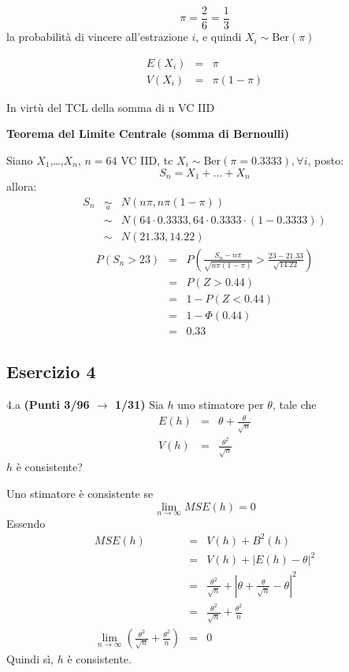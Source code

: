 \documentclass[
  11pt,
]{book}
\theoremstyle{mytheoremstyle}
\theoremstyle{mydefstyle}
\newenvironment{sol}
  {
  \begin{tcolorbox}[enhanced,breakable,arc=0.1mm,boxrule=1pt,colback=white,colframe=iblue,
  title=\bf \fontfamily{lmss}\selectfont \hspace{.5 cm} Soluzione,drop fuzzy shadow]

}{
\end{tcolorbox}
  }
\begin{document}
\begin{sol}
\[
\pi=\frac 2 6=\frac 13
\]
la probabilità di vincere all'estrazione \(i\), e quindi \(X_i\sim\text{Ber}(\pi)\)

\begin{eqnarray*}
E(X_i)&=&\pi\\
V(X_i)&=&\pi(1-\pi)
\end{eqnarray*}

In virtù del TCL della somma di n VC IID

\textbf{Teorema del Limite Centrale (somma di Bernoulli)}

Siano \(X_1\),\ldots,\(X_n\), \(n=64\) VC IID, tc \(X_i\sim\text{Ber}(\pi=0.3333)\)\(,\forall i\), posto:
\[
      S_n = X_1 + ... + X_n
      \]
allora:\begin{eqnarray*}
  S_n & \mathop{\sim}\limits_{a}& N(n\pi,n\pi(1-\pi)) \\
      &\sim & N(64\cdot0.3333,64\cdot0.3333\cdot(1-0.3333)) \\
      &\sim & N(21.33,14.22)
  \end{eqnarray*}\begin{eqnarray*}
      P( S_n   >   23 ) 
        &=& P\left(  \frac { S_n  -  n\pi }{ \sqrt{n\pi(1-\pi)} }  >  \frac { 23  -  21.33 }{\sqrt{ 14.22 }} \right)  \\
                 &=& P\left(  Z   >   0.44 \right) \\    &=& 1-P(Z< 0.44 )\\ 
                 &=&  1-\Phi( 0.44 ) \\ &=&  0.33 
      \end{eqnarray*}

\end{sol}

\subsection{Esercizio 4}\label{esercizio-4-4}

4.a \textbf{(Punti 3/96 \(\rightarrow\) 1/31)} Sia \(h\) uno stimatore per \(\theta\), tale che
\begin{eqnarray*}
E(h)&=&\theta+\frac\theta {\sqrt{ n}}\\
V(h)&=&\frac{\theta^2}{\sqrt n}
\end{eqnarray*}
\(h\) è consistente?

\begin{sol}
Uno stimatore è consistente se
\[
\lim_{n\to\infty} MSE(h)=0
\]
Essendo
\begin{eqnarray*}
MSE(h)&=&V(h)+B^2(h)\\
&=&V(h)+|E(h)-\theta|^2\\
&=&\frac{\theta^2}{\sqrt n}+\left|\theta+\frac\theta {\sqrt{ n}}-\theta\right|^2\\
&=&\frac{\theta^2}{\sqrt n}+\frac{\theta^2} { n}\\
\lim_{n\to\infty} \left(\frac{\theta^2}{\sqrt n}+\frac{\theta^2} { n}\right)&=&0
\end{eqnarray*}
Quindi sì, \(h\) è consistente.

\end{sol}
\end{document}

